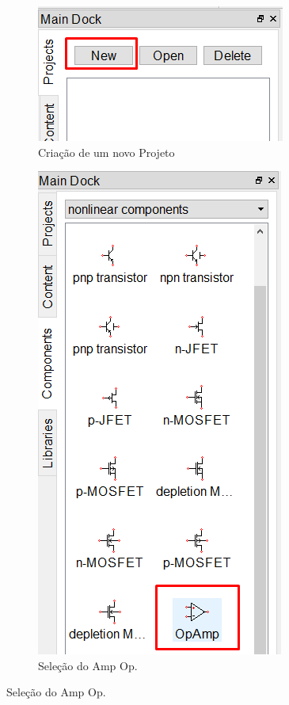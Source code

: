 \begin{figure}[H]
    \begin{subfigure}{.4\textwidth}
        \centering
        \includegraphics[width=.7\textwidth]{imagens/CircuitoA/new.png}
        \caption{Criação de um novo Projeto}
        \label{fig:new_proj}
    \end{subfigure}    
    \begin{subfigure}{.4\textwidth}
        \centering
        \includegraphics[width=.7\textwidth, trim={ 0 0 0 9cm}, clip]{imagens/CircuitoA/OpAmp.png}
        \caption{Seleção do Amp Op.}
        \label{fig:sel_ampop}
    \end{subfigure}
    

\end{figure}

